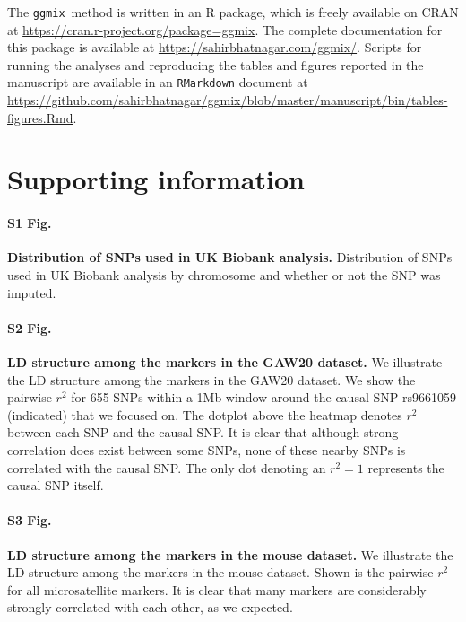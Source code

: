 \documentclass[10pt,letterpaper]{article}
\newcommand{\ggmix}{\texttt{ggmix}}
\begin{document}
The \ggmix ~method is written in an R package, which is freely available on CRAN at \url{https://cran.r-project.org/package=ggmix}. The complete documentation for this package is available at \url{https://sahirbhatnagar.com/ggmix/}. Scripts for running the analyses and reproducing the tables and figures reported in the manuscript are available in an \texttt{RMarkdown} document at \url{https://github.com/sahirbhatnagar/ggmix/blob/master/manuscript/bin/tables-figures.Rmd}.



\section*{Supporting information}



\paragraph*{S1 Fig.}
\label{S1_Fig}
{\bf Distribution of SNPs used in UK Biobank analysis.} Distribution of SNPs used in UK Biobank analysis by chromosome and whether or not the SNP was imputed.

\paragraph*{S2 Fig.}
\label{S2_Fig}
{\bf LD structure among the markers in the GAW20 dataset.} We illustrate the LD structure among the markers in the GAW20 dataset. We show the pairwise $r^2$ for 655 SNPs within a 1Mb-window around the causal SNP rs9661059 (indicated) that we focused on. The dotplot above the heatmap denotes $r^2$ between each SNP and the causal SNP. It is clear that although strong correlation does exist between some SNPs, none of these nearby SNPs is correlated with the causal SNP. The only dot denoting an $r^2=1$ represents the causal SNP itself.

\paragraph*{S3 Fig.}
\label{S3_Fig}
{\bf LD structure among the markers in the mouse dataset.} We illustrate the LD structure among the markers in the mouse dataset. Shown is the pairwise $r^2$ for all microsatellite markers. It is clear that many markers are considerably strongly correlated with each other, as we expected.
\end{document}
